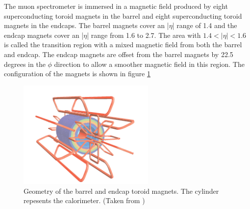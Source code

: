 \indent The muon spectrometer is immersed in a magnetic field produced by eight superconducting toroid magnets in the barrel and eight superconducting toroid magnets in the endcaps. The barrel magnets cover an |$\eta$| range of 1.4 and the endcap magnets cover an |$\eta$| range from 1.6 to 2.7. The area with $1.4 < |\eta| < 1.6$ is called the transition region with a mixed magnetic field from both the barrel and endcap. The endcap magnets are offset from the barrel magnets by 22.5 degrees in the $\phi$ direction to allow a smoother magnetic field in this region. The configuration of the magnets is shown in figure \ref{LHC:fig:ATLASMag} ~\\
\begin{figure}[h!]
\centering
\includegraphics[width=0.60\textwidth, angle=270]{figures/DET/ATLAS_ToroidMag.PNG}
\caption{ Geometry of the barrel and endcap toroid magnets. The cylinder repesents the calorimeter. (Taken from \cite{biblio:JINST}) \label{LHC:fig:ATLASMag}}
\end{figure}

